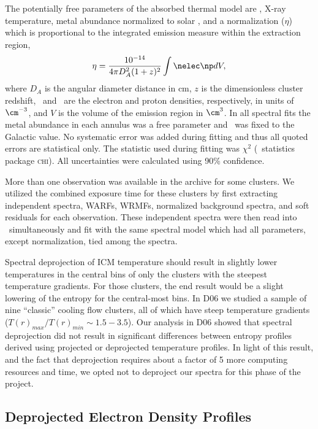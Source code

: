 \documentclass{emulateapj}
\begin{document}
The potentially free parameters of the absorbed thermal model are
\nhi, X-ray temperature, metal abundance normalized to solar
\citep[heavy-element ratios taken from][]{ag89}, and a normalization
($\eta$) which is proportional to the integrated emission measure
within the extraction region,
\begin{equation}
\label{eqn:norm}
\eta = \frac{10^{-14}}{4\pi D_A^2(1+z)^2}\int \nelec \np dV,
\end{equation}
where $D_A$ is the angular diameter distance in cm, $z$ is the
dimensionless cluster redshift, \nelec\ and \np\ are the electron and
proton densities, respectively, in units of $\cm^{-3}$, and $V$ is the
volume of the emission region in $\cm^3$. In all spectral fits the
metal abundance in each annulus was a free parameter and \nhi\ was
fixed to the Galactic value. No systematic error was added during
fitting and thus all quoted errors are statistical only. The statistic
used during fitting was $\chi^2$ (\xspec\ statistics package
\textsc{chi}). All uncertainties were calculated using 90\%
confidence.

More than one observation was available in the archive for some
clusters. We utilized the combined exposure time for these clusters by
first extracting independent spectra, WARFs, WRMFs, normalized
background spectra, and soft residuals for each observation. These
independent spectra were then read into \xspec\ simultaneously and fit
with the same spectral model which had all parameters, except
normalization, tied among the spectra.

Spectral deprojection of ICM temperature should result in slightly
lower temperatures in the central bins of only the clusters with the
steepest temperature gradients. For those clusters, the end result
would be a slight lowering of the entropy for the central-most
bins. In D06 we studied a sample of nine ``classic'' cooling flow
clusters, all of which have steep temperature gradients
($T(r)_{max}/T(r)_{min} \sim 1.5-3.5$). Our analysis in D06 showed
that spectral deprojection did not result in significant differences
between entropy profiles derived using projected or deprojected
temperature profiles. In light of this result, and the fact that
deprojection requires about a factor of 5 more computing resources and
time, we opted not to deproject our spectra for this phase of the
project.

\subsection{Deprojected Electron Density Profiles}
\label{sec:dene}
\end{document}
